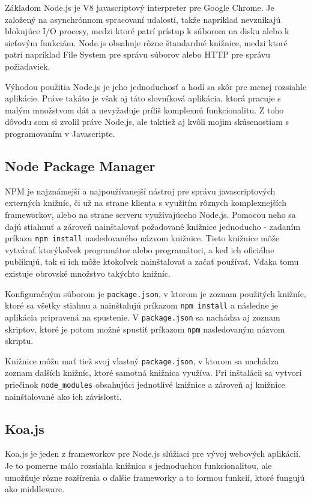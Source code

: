 \documentclass[
  digital, %
  table,   %
  lof,     %
  lot,     %
]{fithesis3}
\begin{document}
Základom Node.js je V8 javascriptový interpreter pre Google Chrome. Je založený na asynchrónnom spracovaní udalostí, takže napríklad nevznikajú blokujúce I/O procesy, medzi ktoré patrí prístup k súborom na disku alebo k sieťovým funkciám. Node.js obsahuje rôzne štandardné knižnice, medzi ktoré patrí napríklad File System pre správu súborov alebo HTTP pre správu požiadaviek.

Výhodou použitia Node.js je jeho jednoduchosť a hodí sa skôr pre menej rozsiahle aplikácie. Práve takáto je však aj táto slovníková aplikácia, ktorá pracuje s malým množstvom dát a nevyžaduje príliš komplexnú funkcionalitu. Z toho dôvodu som si zvolil práve Node.js, ale taktiež aj kvôli mojim skúsenostiam s programovaním v Javascripte.

\subsection{Node Package Manager}
NPM je najznámejší a najpoužívanejší nástroj pre správu javascriptových externých knižníc, či už na strane klienta s využitím rôznych komplexnejších frameworkov, alebo na strane serveru využívajúceho Node.js. Pomocou neho sa dajú stiahnuť a zároveň nainštalovať požadované knižnice jednoducho - zadaním príkazu \texttt{npm install} nasledovaného názvom knižnice. Tieto knižnice môže vytvárať ktorýkoľvek programátor alebo programátori, a keď ich oficiálne publikujú, tak si ich môže ktokoľvek nainštalovať a začať používať. Vďaka tomu existuje obrovské množstvo takýchto knižníc.

Konfiguračným súborom je \texttt{package.json}, v ktorom je zoznam použitých knižníc, ktoré sa všetky stiahnu a nainštalujú príkazom \texttt{npm install} a následne je aplikácia pripravená na spustenie. V \texttt{package.json} sa nachádza aj zoznam skriptov, ktoré je potom možné spustiť príkazom \texttt{npm} nasledovaným názvom skriptu.

Knižnice môžu mať tiež svoj vlastný \texttt{package.json}, v ktorom sa nachádza zoznam ďalších knižníc, ktoré samotná knižnica využíva. Pri inštalácii sa vytvorí priečinok \texttt{node\_modules} obsahujúci jednotlivé knižnice a zároveň aj knižnice nainštalované ako ich závislosti.

\subsection{Koa.js}
Koa.js je jeden z frameworkov pre Node.js slúžiaci pre vývoj webových aplikácií. Je to pomerne málo rozsiahla knižnica s jednoduchou funkcionalitou, ale umožňuje rôzne rozšírenia o ďalšie frameworky a to formou funkcií, ktoré fungujú ako middleware. 
\end{document}
